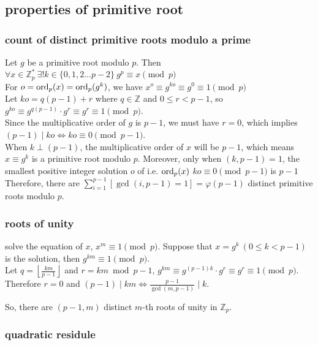 \documentclass{article}
\newcommand{\ZZ}{\mathbb{Z}}
\newcommand{\floor}[1]{\left\lfloor{#1}\right\rfloor}
\begin{document}
\subsection{properties of primitive root}

\subsubsection{count of distinct primitive roots modulo a prime}

Let $g$ be a primitive root modulo $p$.
Then $\forall x\in \ZZ_p^\ast\ \exists!k\in\{0,1,2\ldots p-2\}\ g^p\equiv x\pmod p$\\
For $o=\mathrm{ord}_p(x)=\mathrm{ord}_p(g^k)$, we have
$x^o\equiv g^{ko}\equiv g^{0}\equiv 1\pmod p$\\
Let $ko=q(p-1)+r$ where $q\in \ZZ$ and $0\leq r<p-1$, 
so $g^{ko}\equiv g^{q(p-1)}\cdot g^{r}\equiv g^r\equiv 1\pmod p$.\\
Since the multiplicative order of $g$ is $p-1$, we must have $r=0$,
which implies $(p-1)\mid ko\iff ko\equiv 0\pmod{p-1}$.\\

When $k\perp (p-1)$, the multiplicative order of $x$ will be $p-1$, which means $x\equiv g^k$ is a primitive root modulo $p$.
Moreover, only when $(k,p-1)=1$, the smallest positive integer solution $o$ of i.e. $\mathrm{ord}_p(x)$ $ko\equiv 0\pmod {p-1}$ is $p-1$\\
Therefore, there are $\sum_{i=1}^{p-1}[\gcd(i,p-1)=1]=\varphi(p-1)$ distinct primitive roots modulo $p$.

\subsubsection{roots of unity}

solve the equation of $x$, $x^m \equiv 1\pmod p$.
Suppose that $x=g^k\ (0\leq k<p-1)$ is the solution, then $g^{km}\equiv 1\pmod p$.\\
Let $q=\floor{\frac{km}{p-1}}$ and $r=km\bmod {p-1}$, 
$g^{km}\equiv g^{(p-1)k}\cdot g^r\equiv g^r\equiv 1\pmod p$.\\
Therefore $r=0$ and $(p-1)\mid km\iff \frac{p-1}{\gcd(m,p-1)}\mid k$.

So, there are $(p-1,m)$ distinct $m$-th roots of unity in $\ZZ_p$.

\subsubsection{quadratic residule}
\end{document}
